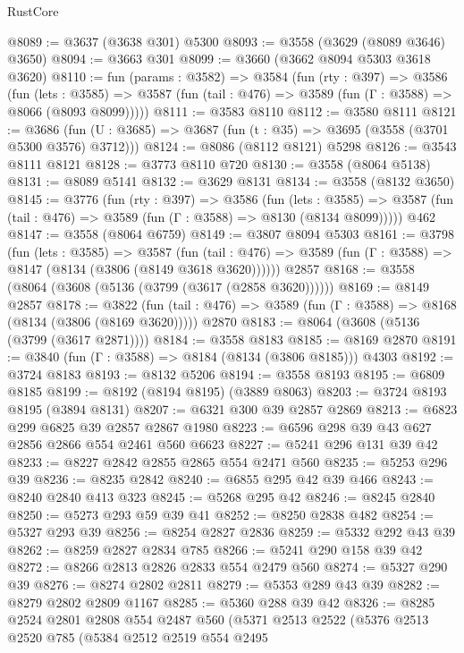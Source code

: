 \begin{lexlean}{RustCore}
\begin{coremodule}
@8089 := @3637 (@3638 @301) @5300
@8093 := @3558 (@3629 (@8089 @3646) @3650)
@8094 := @3663 @301
@8099 := @3660 (@3662 @8094 @5303 @3618 @3620)
@8110 := fun (params : @3582) =>
  @3584
    (fun (rty : @397) =>
    @3586
      (fun (lets : @3585) =>
      @3587 (fun (tail : @476) => @3589 (fun (Γ : @3588) => @8066 (@8093 @8099)))))
@8111 := @3583 @8110
@8112 := @3580 @8111
@8121 := @3686 (fun (U : @3685) => @3687 (fun (t : @35) => @3695 (@3558 (@3701 @5300 @3576) @3712)))
@8124 := @8086 (@8112 @8121) @5298
@8126 := @3543 @8111 @8121
@8128 := @3773 @8110 @720
@8130 := @3558 (@8064 @5138)
@8131 := @8089 @5141
@8132 := @3629 @8131
@8134 := @3558 (@8132 @3650)
@8145 := @3776
    (fun (rty : @397) =>
    @3586
      (fun (lets : @3585) =>
      @3587 (fun (tail : @476) => @3589 (fun (Γ : @3588) => @8130 (@8134 @8099)))))
    @462
@8147 := @3558 (@8064 @6759)
@8149 := @3807 @8094 @5303
@8161 := @3798
    (fun (lets : @3585) =>
    @3587
      (fun (tail : @476) => @3589 (fun (Γ : @3588) => @8147 (@8134 (@3806 (@8149 @3618 @3620))))))
    @2857
@8168 := @3558 (@8064 (@3608 (@5136 (@3799 (@3617 (@2858 @3620))))))
@8169 := @8149 @2857
@8178 := @3822
    (fun (tail : @476) => @3589 (fun (Γ : @3588) => @8168 (@8134 (@3806 (@8169 @3620)))))
    @2870
@8183 := @8064 (@3608 (@5136 (@3799 (@3617 @2871))))
@8184 := @3558 @8183
@8185 := @8169 @2870
@8191 := @3840 (fun (Γ : @3588) => @8184 (@8134 (@3806 @8185))) @4303
@8192 := @3724 @8183
@8193 := @8132 @5206
@8194 := @3558 @8193
@8195 := @6809 @8185
@8199 := @8192 (@8194 @8195) (@3889 @8063)
@8203 := @3724 @8193 @8195 (@3894 @8131)
@8207 := @6321 @300 @39 @2857 @2869
@8213 := @6823 @299 @6825 @39 @2857 @2867 @1980
@8223 := @6596 @298 @39 @43 @627 @2856 @2866 @554 @2461 @560 @6623
@8227 := @5241 @296 @131 @39 @42
@8233 := @8227 @2842 @2855 @2865 @554 @2471 @560
@8235 := @5253 @296 @39
@8236 := @8235 @2842
@8240 := @6855 @295 @42 @39 @466
@8243 := @8240 @2840 @413 @323
@8245 := @5268 @295 @42
@8246 := @8245 @2840
@8250 := @5273 @293 @59 @39 @41
@8252 := @8250 @2838 @482
@8254 := @5327 @293 @39
@8256 := @8254 @2827 @2836
@8259 := @5332 @292 @43 @39
@8262 := @8259 @2827 @2834 @785
@8266 := @5241 @290 @158 @39 @42
@8272 := @8266 @2813 @2826 @2833 @554 @2479 @560
@8274 := @5327 @290 @39
@8276 := @8274 @2802 @2811
@8279 := @5353 @289 @43 @39
@8282 := @8279 @2802 @2809 @1167
@8285 := @5360 @288 @39 @42
@8326 := @8285
    @2524
    @2801
    @2808
    @554
    @2487
    @560
    (@5371
      @2513
      @2522
      (@5376
        @2513
        @2520
        @785
        (@5384
          @2512
          @2519
          @554
          @2495

\end{coremodule}
\end{lexlean}

